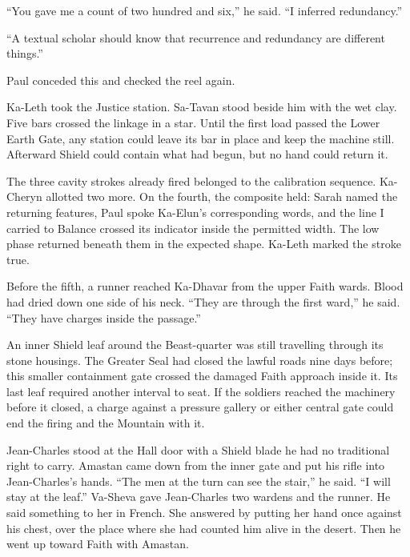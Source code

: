 ``You gave me a count of two hundred and six,'' he said. ``I inferred redundancy.''\par

``A textual scholar should know that recurrence and redundancy are different things.''\par

Paul conceded this and checked the reel again.\par

\ornament

Ka-Leth took the Justice station. Sa-Tavan stood beside him with the wet clay. Five bars crossed the linkage in a star. Until the first load passed the Lower Earth Gate, any station could leave its bar in place and keep the machine still. Afterward Shield could contain what had begun, but no hand could return it.\par

The three cavity strokes already fired belonged to the calibration sequence. Ka-Cheryn allotted two more. On the fourth, the composite held: Sarah named the returning features, Paul spoke Ka-Elun's corresponding words, and the line I carried to Balance crossed its indicator inside the permitted width. The low phase returned beneath them in the expected shape. Ka-Leth marked the stroke true.\par

Before the fifth, a runner reached Ka-Dhavar from the upper Faith wards. Blood had dried down one side of his neck. ``They are through the first ward,'' he said. ``They have charges inside the passage.''\par

An inner Shield leaf around the Beast-quarter was still travelling through its stone housings. The Greater Seal had closed the lawful roads nine days before; this smaller containment gate crossed the damaged Faith approach inside it. Its last leaf required another interval to seat. If the soldiers reached the machinery before it closed, a charge against a pressure gallery or either central gate could end the firing and the Mountain with it.\par

Jean-Charles stood at the Hall door with a Shield blade he had no traditional right to carry. Amastan came down from the inner gate and put his rifle into Jean-Charles's hands. ``The men at the turn can see the stair,'' he said. ``I will stay at the leaf.'' Va-Sheva gave Jean-Charles two wardens and the runner. He said something to her in French. She answered by putting her hand once against his chest, over the place where she had counted him alive in the desert. Then he went up toward Faith with Amastan.\par

